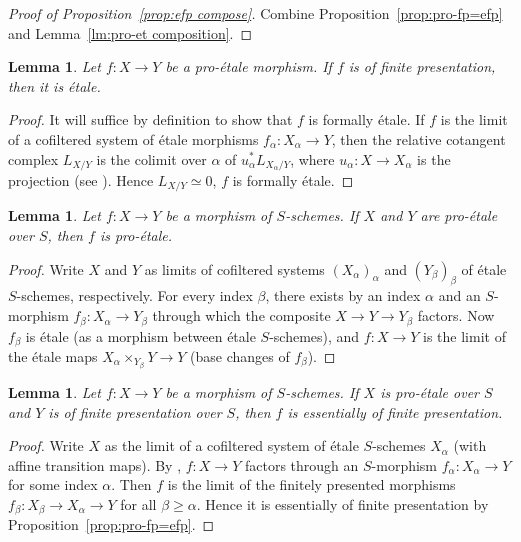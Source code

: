 \documentclass[JEP,XML,SOM,Unicode]{cedram}
\newtheorem{lm}[thm]{Lemma}
\theoremstyle{remark}
\theoremstyle{definition}
\numberwithin{equation}{thm}
\begin{document}
\begin{proof}[Proof of Proposition~\ref{prop:efp compose}]
Combine Proposition~\ref{prop:pro-fp=efp} and Lemma~\ref{lm:pro-et composition}.
\end{proof}

\begin{lm}\label{lm:pro-et+fp}
Let $f : X \to Y$ be a pro-étale morphism.
If $f$ is of finite presentation, then it is étale.
\end{lm}
\begin{proof}
It will suffice by definition to show that $f$ is formally étale.
If $f$ is the limit of a cofiltered system of étale morphisms $f_\alpha : X_\alpha \to Y$, then the relative cotangent complex $L_{X/Y}$ is the colimit over $\alpha$ of $u_\alpha^*L_{X_\alpha/Y}$, where $u_\alpha : X \to X_\alpha$ is the projection (see \eg \cite[Tags~08S9, 08R2]{Stacks}).
Hence $L_{X/Y} \simeq 0$, \ie $f$ is formally étale.
\end{proof}

\begin{lm}\label{lm:pro-et 2-of-3}
Let $f : X \to Y$ be a morphism of $S$-schemes.
If $X$ and $Y$ are pro-étale over $S$, then $f$ is pro-étale.
\end{lm}
\begin{proof}
Write $X$ and $Y$ as limits of cofiltered systems $(X_\alpha)_\alpha$ and $(Y_\beta)_\beta$ of étale $S$\nobreakdash-schemes, respectively.
For every index $\beta$, there exists by \cite[Prop.\,8.14.2]{EGA4} an index $\alpha$ and an $S$-morphism $f_\beta : X_\alpha \to Y_\beta$ through which the composite $X \to Y \to Y_\beta$ factors.
Now $f_\beta$ is étale (as a morphism between étale $S$-schemes), and $f : X \to Y$ is the limit of the étale maps $X_\alpha \times_{Y_\beta} Y \to Y$ (base changes of $f_\beta$).
\end{proof}

\begin{lm}\label{lm:efp 2-of-3}
Let $f : X \to Y$ be a morphism of $S$-schemes.
If $X$ is pro-étale over $S$ and $Y$ is of finite presentation over $S$, then $f$ is essentially of finite presentation.
\end{lm}
\begin{proof}
Write $X$ as the limit of a cofiltered system of étale $S$-schemes $X_\alpha$ (with affine transition maps).
By \cite[Prop.\,8.14.2]{EGA4}, $f : X \to Y$ factors through an $S$-morphism $f_\alpha : X_\alpha \to Y$ for some index $\alpha$.
Then $f$ is the limit of the finitely presented morphisms $f_\beta : X_\beta \to X_\alpha \to Y$ for all $\beta\geqslant\alpha$.
Hence it is essentially of finite presentation by Proposition~\ref{prop:pro-fp=efp}.
\end{proof}
\end{document}
